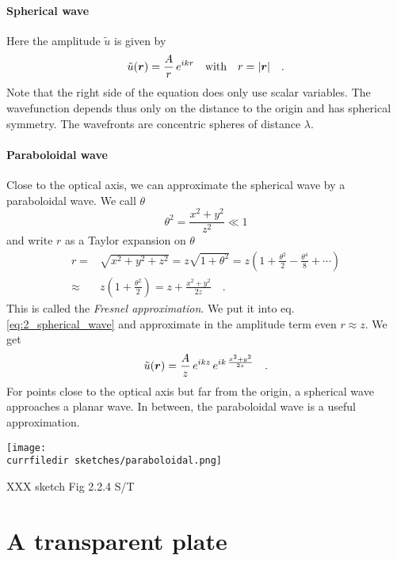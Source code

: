 \paragraph*{Spherical wave} Here the amplitude $\tilde{u}$ is given by
\begin{equation}
 \tilde{u}(\boldsymbol{r}) = \frac{A}{r} \, e^{i k r} \quad \text{with} \quad r = |\boldsymbol{r}| \quad .
 \label{eq:2_spherical_wave}
\end{equation}
Note that the right side of the equation does only use scalar variables. The wavefunction depends thus only on the distance to the origin and has spherical symmetry. The wavefronts are concentric spheres of distance $\lambda$.

\paragraph*{Paraboloidal wave} Close to the optical axis, we can approximate the spherical wave by a paraboloidal wave. We call $\theta$
\begin{equation}
    \theta^2 =  \frac{x^2 + y^2}{z^2} \ll 1
\end{equation}
and write $r$ as a Taylor expansion on $\theta$
\begin{align}
    r = & \sqrt{x^2 + y^2 + z^2}= z \sqrt{1 + \theta^2}
    = z \left( 1 + \frac{\theta^2}{2} - \frac{\theta^4}{8} + \cdots \right) \\
    \approx & z \left( 1 + \frac{\theta^2}{2} \right) = z + \frac{x^2 + y^2}{2z}  \quad .
\end{align}
This is called the \emph{Fresnel approximation}. We put it into eq.  \ref{eq:2_spherical_wave} and approximate in the amplitude term even $r \approx z$. We get
\begin{equation}
    \tilde{u}(\boldsymbol{r}) = \frac{A}{z} \, e^{i k z} \, e^{i k \, \frac{x^2 + y^2}{2z}  } \quad .
\end{equation}
For points close to the optical axis but far from the origin, a spherical wave approaches a planar wave. In between, the paraboloidal wave is a useful approximation.


\begin{marginfigure}
    \texttt{[image: \\currfiledir sketches/paraboloidal.png]}
   \caption{XXX sketch Fig 2.2.4 S/T}
\end{marginfigure}


\section{A transparent plate}

